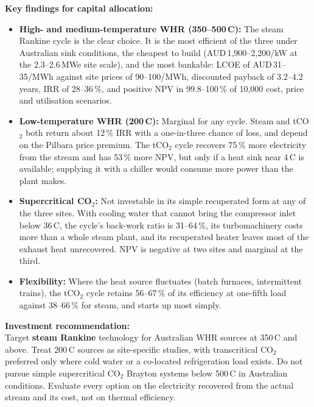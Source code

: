 \textbf{Key findings for capital allocation:}
\begin{itemize}[leftmargin=1.5em,itemsep=6pt]
\item \textbf{High- and medium-temperature WHR (350--500\,\textdegree C):}
The steam Rankine cycle is the clear choice. It is the most efficient of the
three under Australian sink conditions, the cheapest to build
(AUD\,1{,}900--2{,}200/kW at the 2.3--2.6\,MWe site scale), and the most
bankable: LCOE of AUD\,31--35/MWh against site prices of 90--100/MWh,
discounted payback of 3.2--4.2 years, IRR of 28--36\,\%, and positive NPV in
99.8--100\,\% of 10,000 cost, price and utilisation scenarios.
\item \textbf{Low-temperature WHR (200\,\textdegree C):} Marginal for any
cycle. Steam and tCO$_2$ both return about 12\,\% IRR with a one-in-three
chance of loss, and depend on the Pilbara price premium. The tCO$_2$ cycle
recovers 75\,\% more electricity from the stream and has 53\,\% more NPV, but
only if a heat sink near 4\,\textdegree C is available; supplying it with a
chiller would consume more power than the plant makes.
\item \textbf{Supercritical CO$_2$:} Not investable in its simple recuperated
form at any of the three sites. With cooling water that cannot bring the
compressor inlet below 36\,\textdegree C, the cycle's back-work ratio is
31--64\,\%, its turbomachinery costs more than a whole steam plant, and its
recuperated heater leaves most of the exhaust heat unrecovered. NPV is
negative at two sites and marginal at the third.
\item \textbf{Flexibility:} Where the heat source fluctuates (batch
furnaces, intermittent trains), the tCO$_2$ cycle retains 56--67\,\% of its
efficiency at one-fifth load against 38--66\,\% for steam, and starts up most
simply.
\end{itemize}

\textbf{Investment recommendation:}\\
Target \textbf{steam Rankine} technology for Australian WHR sources at
350\,\textdegree C and above. Treat 200\,\textdegree C sources as
site-specific studies, with transcritical CO$_2$ preferred only where cold
water or a co-located refrigeration load exists. Do not pursue simple
supercritical CO$_2$ Brayton systems below 500\,\textdegree C in Australian
conditions. Evaluate every option on the electricity recovered from the
actual stream and its cost, not on thermal efficiency.

\clearpage

